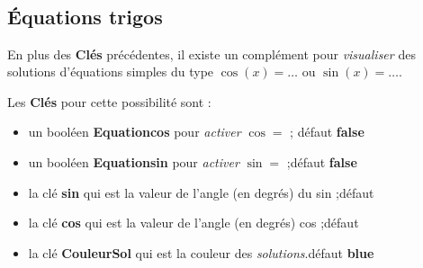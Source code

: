 \documentclass[a4paper,french,11pt]{article}
\newcommand\Cle[1]{{\bfseries\sffamily\textlangle #1\textrangle}}
\begin{document}
\pagebreak

\begin{codetex}
\begin{center}
	\begin{tikzpicture}[line join=bevel]
			\CercleTrigo[Rayon=2.5,AffValeurs=false,Decal=8pt]
		\end{tikzpicture}
	~~~~
	\begin{tikzpicture}[line join=bevel]
			\CercleTrigo[Rayon=2.5,AffAngles=false]
		\end{tikzpicture}
	~~~~
	\begin{tikzpicture}[line join=bevel]
			\CercleTrigo[Rayon=2.5,MoinsPi=false,CouleurFond=orange!15]
		\end{tikzpicture}
\end{center}
\end{codetex}

\begin{codesortie}
\begin{center}
	\begin{tikzpicture}[line join=bevel]
			\CercleTrigo[Rayon=2.5,AffValeurs=false,Decal=8pt]
		\end{tikzpicture}
	~~~~
	\begin{tikzpicture}[line join=bevel]
			\CercleTrigo[Rayon=2.5,AffAngles=false]
		\end{tikzpicture}
	~~~~
	\begin{tikzpicture}[line join=bevel]
			\CercleTrigo[Rayon=2.5,MoinsPi=false,CouleurFond=orange!15,TailleValeurs=\tiny]
		\end{tikzpicture}
\end{center}
\end{codesortie}

\subsection{Équations trigos}

\begin{codeinfo}
En plus des \Cle{Clés} précédentes, il existe un complément pour \textit{visualiser} des solutions d'équations simples du type $\cos(x)=\ldots$ ou $\sin(x)=\ldots$.
\end{codeinfo}

\begin{codecles}
Les \Cle{Clés} pour cette possibilité sont :

\begin{itemize}
	\item un booléen \Cle{Equationcos} pour \textit{activer} \og $\cos=$ \fg; \hfill{}défaut \Cle{false}
	\item un booléen \Cle{Equationsin} pour \textit{activer} \og $\sin=$ \fg;\hfill{}défaut \Cle{false}
	\item la clé \Cle{sin} qui est la valeur de l'angle (en degrés) du sin ;\hfill{}défaut \Cle{30}
	\item la clé \Cle{cos} qui est la valeur de l'angle (en degrés) cos ;\hfill{}défaut \Cle{45}
	\item la clé \Cle{CouleurSol} qui est la couleur des \textit{solutions}.\hfill{}défaut \Cle{blue}
\end{itemize}
\end{codecles}
\end{document}
